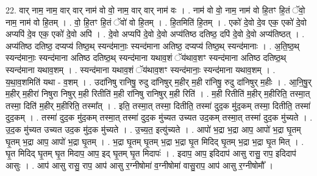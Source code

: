 \documentclass[17pt]{extarticle}
\begin{document}
22. वार् नाम॒ नाम॒ वार् वार् नाम॑ वो वो॒ नाम॒ वार् वार् नाम॑ वः । . नाम॑ वो वो॒ नाम॒ नाम॑ वो हि॒तꣳ हि॒तं ॅवो॒ नाम॒ नाम॑ वो हि॒तम् । . वो॒ हि॒तꣳ हि॒तं ॅवो॑ वो हि॒तम् । . हि॒तमिति॑ हि॒तम् । . एको॑ दे॒वो दे॒व एक॒ एको॑ दे॒वो अप्यपि॑ दे॒व एक॒ एको॑ दे॒वो अपि॑ । . दे॒वो अप्यपि॑ दे॒वो दे॒वो अप्य॑तिष्ठ दतिष्ठ॒ दपि॑ दे॒वो दे॒वो अप्य॑तिष्ठत् । . अप्य॑तिष्ठ दतिष्ठ॒ दप्यप्य॑ तिष्ठ॒थ् स्यन्द॑मानाः॒ स्यन्द॑माना अतिष्ठ॒ दप्यप्य॑ तिष्ठ॒थ् स्यन्द॑मानाः । . अ॒ति॒ष्ठ॒थ् स्यन्द॑मानाः॒ स्यन्द॑माना अतिष्ठ दतिष्ठ॒थ् स्यन्द॑माना यथाव॒शं ॅय॑थाव॒शꣳ स्यन्द॑माना अतिष्ठ दतिष्ठ॒थ् स्यन्द॑माना यथाव॒शम् । . स्यन्द॑माना यथाव॒शं ॅय॑थाव॒शꣳ स्यन्द॑मानाः॒ स्यन्द॑माना यथाव॒शम् । . य॒था॒व॒शमिति॑ यथा - व॒शम् । . उदा॑निषु रानिषु॒ रुदु दा॑निषुर् म॒हीर् म॒ही रा॑निषु॒ रुदु दा॑निषुर् म॒हीः । . आ॒नि॒षु॒र् म॒हीर् म॒हीरा॑ निषुरा निषुर् म॒ही रितीति॑ म॒ही रा॑निषु रानिषुर् म॒ही रिति॑ । . म॒ही रितीति॑ म॒हीर् म॒हीरिति॒ तस्मा॒त् तस्मा॒ दिति॑ म॒हीर् म॒हीरिति॒ तस्मा᳚त् । . इति॒ तस्मा॒त् तस्मा॒ दितीति॒ तस्मा॑ दुद॒क मु॑द॒कम् तस्मा॒ दितीति॒ तस्मा॑ दुद॒कम् । . तस्मा॑ दुद॒क मु॑द॒कम् तस्मा॒त् तस्मा॑ दुद॒क मु॑च्यत उच्यत उद॒कम् तस्मा॒त् तस्मा॑ दुद॒क मु॑च्यते । . उ॒द॒क मु॑च्यत उच्यत उद॒क मु॑द॒क मु॑च्यते । . उ॒च्य॒त॒ इत्यु॑च्यते । . आपो॑ भ॒द्रा भ॒द्रा आप॒ आपो॑ भ॒द्रा घृ॒तम् घृ॒तम् भ॒द्रा आप॒ आपो॑ भ॒द्रा घृ॒तम् । . भ॒द्रा घृ॒तम् घृ॒तम् भ॒द्रा भ॒द्रा घृ॒त मिदिद् घृ॒तम् भ॒द्रा भ॒द्रा घृ॒त मित् । . घृ॒त मिदिद् घृ॒तम् घृ॒त मिदाप॒ आप॒ इद् घृ॒तम् घृ॒त मिदापः॑ । . इदाप॒ आप॒ इदिदाप॑ आसु रासु॒ राप॒ इदिदाप॑ आसुः । . आप॑ आसु रासु॒ राप॒ आप॑ आसु र॒ग्नीषोमा॑ व॒ग्नीषोमा॑ वासु॒राप॒ आप॑ आसु र॒ग्नीषोमौ᳚ । \newline
\end{document}
